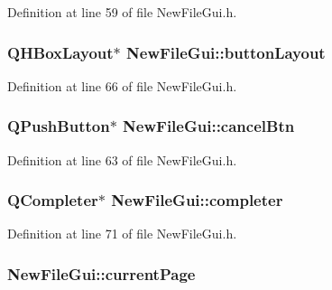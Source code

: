 Definition at line 59 of file New\-File\-Gui.\-h.

\hypertarget{class_new_file_gui_aec890bfe56498ad4c1e3865387f147b5}{
\subsubsection[{button\-Layout}]{\setlength{\rightskip}{0pt plus 5cm}Q\-H\-Box\-Layout$\ast$ New\-File\-Gui\-::button\-Layout\hspace{0.3cm}{\ttfamily [private]}}}\label{class_new_file_gui_aec890bfe56498ad4c1e3865387f147b5}


Definition at line 66 of file New\-File\-Gui.\-h.

\hypertarget{class_new_file_gui_a5be4525cfa97c2ec799a7357eb6a1fb4}{
\subsubsection[{cancel\-Btn}]{\setlength{\rightskip}{0pt plus 5cm}Q\-Push\-Button$\ast$ New\-File\-Gui\-::cancel\-Btn\hspace{0.3cm}{\ttfamily [private]}}}\label{class_new_file_gui_a5be4525cfa97c2ec799a7357eb6a1fb4}


Definition at line 63 of file New\-File\-Gui.\-h.

\hypertarget{class_new_file_gui_a5c8508fb9dba194838e0cfce4d6f7988}{
\subsubsection[{completer}]{\setlength{\rightskip}{0pt plus 5cm}Q\-Completer$\ast$ New\-File\-Gui\-::completer\hspace{0.3cm}{\ttfamily [private]}}}\label{class_new_file_gui_a5c8508fb9dba194838e0cfce4d6f7988}


Definition at line 71 of file New\-File\-Gui.\-h.

\hypertarget{class_new_file_gui_adaf414f47f140c24e8f08797262c646b}{
\subsubsection[{current\-Page}]{ New\-File\-Gui\-::current\-Page\hspace{0.3cm}{\ttfamily [private]}}}\label{class_new_file_gui_adaf414f47f140c24e8f08797262c646b}



